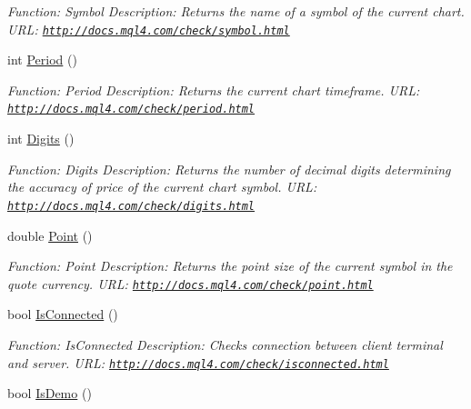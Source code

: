 \begin{DoxyCompactItemize}
\begin{DoxyCompactList}\small\item\em Function\+: Symbol Description\+: Returns the name of a symbol of the current chart. U\+RL\+: \href{http://docs.mql4.com/check/symbol.html}{\tt http\+://docs.\+mql4.\+com/check/symbol.\+html} \end{DoxyCompactList}\item 
int \hyperlink{class_m_q_l4_c_sharp_1_1_base_1_1_m_q_l_base_a96a91acf49c29e0c1654877351edb0a5}{Period} ()
\begin{DoxyCompactList}\small\item\em Function\+: Period Description\+: Returns the current chart timeframe. U\+RL\+: \href{http://docs.mql4.com/check/period.html}{\tt http\+://docs.\+mql4.\+com/check/period.\+html} \end{DoxyCompactList}\item 
int \hyperlink{class_m_q_l4_c_sharp_1_1_base_1_1_m_q_l_base_a33263c9e81165a5d6eba0a4cc95a35cc}{Digits} ()
\begin{DoxyCompactList}\small\item\em Function\+: Digits Description\+: Returns the number of decimal digits determining the accuracy of price of the current chart symbol. U\+RL\+: \href{http://docs.mql4.com/check/digits.html}{\tt http\+://docs.\+mql4.\+com/check/digits.\+html} \end{DoxyCompactList}\item 
double \hyperlink{class_m_q_l4_c_sharp_1_1_base_1_1_m_q_l_base_a5eeec0116ca1f42e494af5ca1b976145}{Point} ()
\begin{DoxyCompactList}\small\item\em Function\+: Point Description\+: Returns the point size of the current symbol in the quote currency. U\+RL\+: \href{http://docs.mql4.com/check/point.html}{\tt http\+://docs.\+mql4.\+com/check/point.\+html} \end{DoxyCompactList}\item 
bool \hyperlink{class_m_q_l4_c_sharp_1_1_base_1_1_m_q_l_base_a4c9e9c55268371b0496c12ffc3695c24}{Is\+Connected} ()
\begin{DoxyCompactList}\small\item\em Function\+: Is\+Connected Description\+: Checks connection between client terminal and server. U\+RL\+: \href{http://docs.mql4.com/check/isconnected.html}{\tt http\+://docs.\+mql4.\+com/check/isconnected.\+html} \end{DoxyCompactList}\item 
bool \hyperlink{class_m_q_l4_c_sharp_1_1_base_1_1_m_q_l_base_a60580cf985d7aa60d28476dcf0697167}{Is\+Demo} ()

\end{DoxyCompactItemize}
